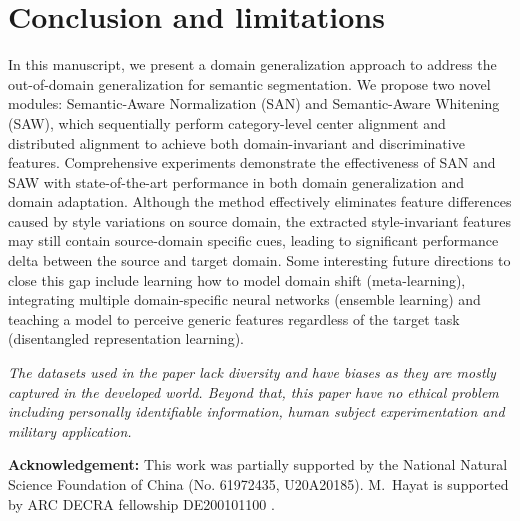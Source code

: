 \documentclass[10pt,twocolumn,letterpaper]{article}
\begin{document}
\begin{table}[t]
\caption{Ablation of different blocks in SAN and SAW}\vspace{-2mm}
\label{tab: CFR and ClassGrouping}
\centering{}\doublerulesep=0.5pt 
\vspace{-4mm}
\end{table}


\section{Conclusion and limitations}

In this manuscript, we present a domain generalization approach to address the out-of-domain generalization for semantic segmentation. We propose two novel modules: Semantic-Aware Normalization (SAN) and Semantic-Aware Whitening (SAW), which sequentially perform category-level center alignment and distributed alignment to achieve both domain-invariant and discriminative features. Comprehensive experiments demonstrate the effectiveness of SAN and SAW with state-of-the-art performance in both domain generalization and domain adaptation. Although the method effectively eliminates feature differences caused by style variations on source domain, the extracted style-invariant features may still contain source-domain specific cues, leading to significant performance delta between the source and target domain. Some interesting future directions to close this gap include learning how to model domain shift (meta-learning), integrating multiple domain-specific neural networks (ensemble learning) and teaching a model to perceive generic features regardless of the target task (disentangled representation learning).




\textit{The datasets used in the paper lack diversity and have biases as they are mostly captured in the developed world. Beyond that, this paper have no ethical problem including personally identifiable information, human subject experimentation and military application.} 

\noindent \textbf{Acknowledgement:} This work was partially supported by the National Natural Science Foundation of China (No. 61972435, U20A20185). M.~Hayat is supported by ARC DECRA fellowship DE200101100 .



\balance
{\small


}
\end{document}
